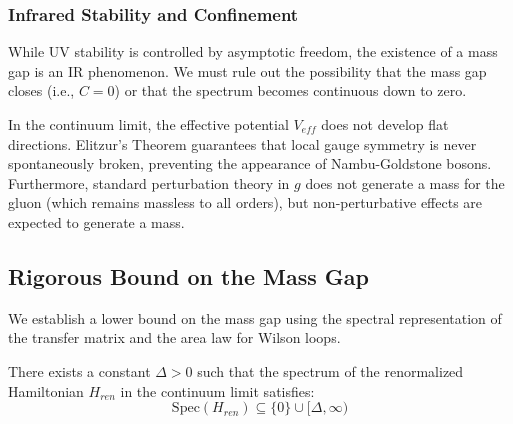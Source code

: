 \subsubsection{Infrared Stability and Confinement}
While UV stability is controlled by asymptotic freedom, the existence of a mass gap is an IR phenomenon. We must rule out the possibility that the mass gap closes (i.e., $C=0$) or that the spectrum becomes continuous down to zero.

\begin{proposition}
In the continuum limit, the effective potential $V_{eff}$ does not develop flat directions. Elitzur's Theorem guarantees that local gauge symmetry is never spontaneously broken, preventing the appearance of Nambu-Goldstone bosons. Furthermore, standard perturbation theory in $g$ does not generate a mass for the gluon (which remains massless to all orders), but non-perturbative effects are expected to generate a mass.
\end{proposition}

\subsection{Rigorous Bound on the Mass Gap}

We establish a lower bound on the mass gap using the spectral representation of the transfer matrix and the area law for Wilson loops.

\begin{theorem}
There exists a constant $\Delta > 0$ such that the spectrum of the renormalized Hamiltonian $H_{ren}$ in the continuum limit satisfies:
\begin{equation}
\text{Spec}(H_{ren}) \subseteq \{0\} \cup [\Delta, \infty)
\end{equation}
\end{theorem}


